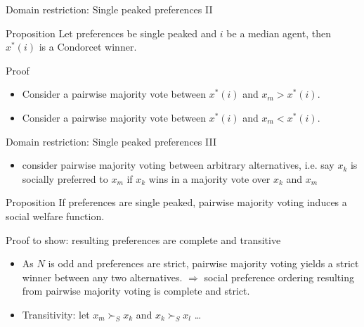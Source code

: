 \documentclass[bigger]{beamer}
\begin{document}
\begin{frame}[label={sec:orgc2814c4}]{Domain restriction: Single peaked preferences II}
\begin{block}{Proposition}
Let preferences be single peaked and \(i\) be a median agent, then \(x^*(i)\) is a Condorcet winner.
\end{block}
\begin{block}{Proof}
\begin{itemize}
\item Consider a pairwise majority vote between \(x^*(i)\) and \(x_m>x^*(i)\).

\vspace*{1.5cm}
\item Consider a pairwise majority vote between \(x^*(i)\) and \(x_m<x^*(i)\).

\vspace*{1.5cm}
\end{itemize}
\end{block}
\end{frame}
\begin{frame}[label={sec:org2ab3d0e}]{Domain restriction: Single peaked preferences III}
\begin{itemize}
\item consider pairwise majority voting between arbitrary alternatives, i.e. say \(x_k\) is socially preferred to \(x_m\) if \(x_k\) wins in a majority vote over \(x_k\) and \(x_m\)
\end{itemize}
\begin{block}{Proposition}
If preferences are single peaked, pairwise majority voting induces a social welfare function.
\end{block}
\begin{block}{Proof}
to show: resulting preferences are complete and transitive
\begin{itemize}
\item As \(N\) is odd and preferences are strict, pairwise majority voting yields a strict winner between any two alternatives.\linebreak
\(\Rightarrow\) social preference ordering resulting from pairwise majority voting is complete and strict.
\item Transitivity: let \(x_m\succ_S x_k\) and \(x_k\succ_S x_l\) \dots{}
\end{itemize}

\vspace*{2cm}
\end{block}
\end{frame}
\end{document}
